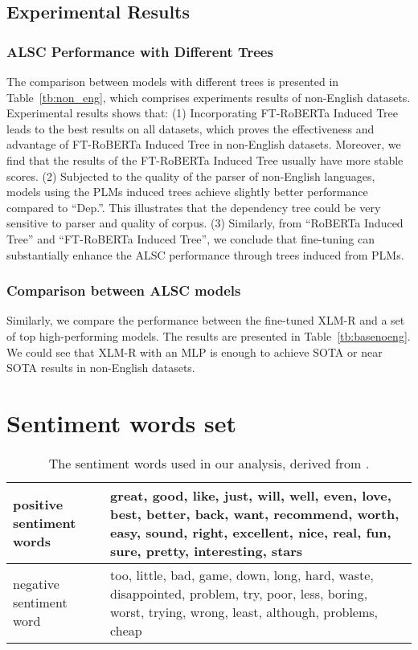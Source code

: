 \documentclass[11pt]{article}
\begin{document}
\subsection{Experimental Results}
\subsubsection{ALSC Performance with Different Trees}
The comparison between models with different trees is presented in Table~\ref{tb:non_eng}, which comprises experiments results of non-English datasets.
Experimental results shows that:
(1) Incorporating FT-RoBERTa Induced Tree leads to the best results on all datasets, which proves the effectiveness and advantage of FT-RoBERTa Induced Tree in non-English datasets. Moreover, we find that the results of  the FT-RoBERTa Induced Tree usually have more stable  scores.
(2) Subjected to the quality of the parser of non-English languages, models using the PLMs induced trees achieve slightly better performance compared to ``Dep.''. This illustrates that the dependency tree could be very sensitive to parser and quality of  corpus.
(3) Similarly, from ``RoBERTa Induced Tree'' and ``FT-RoBERTa Induced Tree'', we  conclude that fine-tuning can substantially enhance the ALSC performance through trees induced from PLMs.





\subsubsection{Comparison between ALSC models}
Similarly, we compare the performance between the fine-tuned XLM-R and a set of top high-performing models. The results are presented in Table~\ref{tb:basenoeng}. We could see that XLM-R with an MLP is enough to achieve SOTA or near SOTA results in non-English datasets.

\section{Sentiment words set}

\begin{table}[h]
  \centering
  \begin{tabular}{|m{2cm}|m{4.5cm}|}
    \hline
    positive sentiment words & great, good, like, just, will, well, even, love, best, better, back, want, recommend, worth, easy, sound, right, excellent, nice, real, fun, sure, pretty, interesting, stars \\
    \hline
    negative sentiment word  & too, little, bad, game, down, long, hard, waste, disappointed, problem, try, poor, less, boring, worst, trying, wrong, least, although, problems, cheap                       \\
    \hline
  \end{tabular}
  \caption{The sentiment words used in our analysis, derived from \citet{DBLP:conf/acl/TianGXLHWWW20}. }
  \label{tb:senti}
\end{table}
\end{document}
